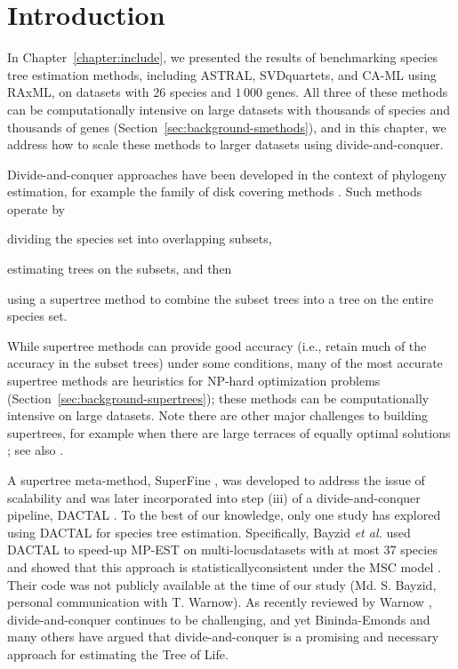 \section{Introduction}
\label{sec:njmerge-introduction}
In Chapter~\ref{chapter:include}, we presented the results of benchmarking species tree estimation methods, including \gls{ASTRAL}, \gls{SVDquartets}, and \gls{CA-ML} using \gls{RAxML}, on datasets with 26 species and $1\,000$ genes.
All three of these methods can be computationally intensive on large datasets with thousands of species and thousands of genes (Section~\ref{sec:background-smethods}), and in this chapter, we address how to scale these methods to larger datasets using divide-and-conquer. 

Divide-and-conquer approaches have been developed in the context of phylogeny estimation, for example the family of disk covering methods \cite{warnow2001absolute, huson1999solving, nakhleh2001designing, lagergren2002combining-dcm}.
Such methods operate by
\begin{enumerate*}[label=(\roman*)]
	\item 
	dividing the species set into overlapping subsets, 	
	\item 
	estimating trees on the subsets, and then
	\item 
	using a \gls{supertree} method to combine the subset trees into a tree on the entire species set.
\end{enumerate*} 
While supertree methods can provide good accuracy (i.e., retain much of the accuracy in the subset trees) under some conditions, many of the most accurate supertree methods are heuristics for NP-hard optimization problems (Section~\ref{sec:background-supertrees}); these methods can be computationally intensive on large datasets.
Note there are other major challenges to building supertrees, for example when there are large terraces of equally optimal solutions \cite{sanderson2011terraces}; see also \cite{brinkmeyer2001polynomial}.

A supertree meta-method, SuperFine \cite{swenson2012superfine}, was developed to address the issue of scalability and was later incorporated into step (iii) of a divide-and-conquer pipeline, DACTAL \cite{nelesen2012dactal}. 
To the best of our knowledge, only one study \cite{bayzid2014disk} has explored using DACTAL for species tree estimation.
Specifically, Bayzid {\em et al.} \cite{bayzid2014disk} used DACTAL to speed-up \gls{MP-EST} on \glspl{multi-locusdataset} with at most 37 species and showed that this approach is \gls{statisticallyconsistent} under the \gls{MSC} model \cite{bayzid2014disk}.
Their code was not publicly available at the time of our study (Md. S. Bayzid, personal communication with T. Warnow).
As recently reviewed by Warnow \cite{warnow2018supertree}, divide-and-conquer continues to be challenging, and yet Bininda-Emonds and many others \cite{bininda2007taxon, bininda2004phylogenetic} have argued that divide-and-conquer is a promising and necessary approach for estimating the Tree of Life.

